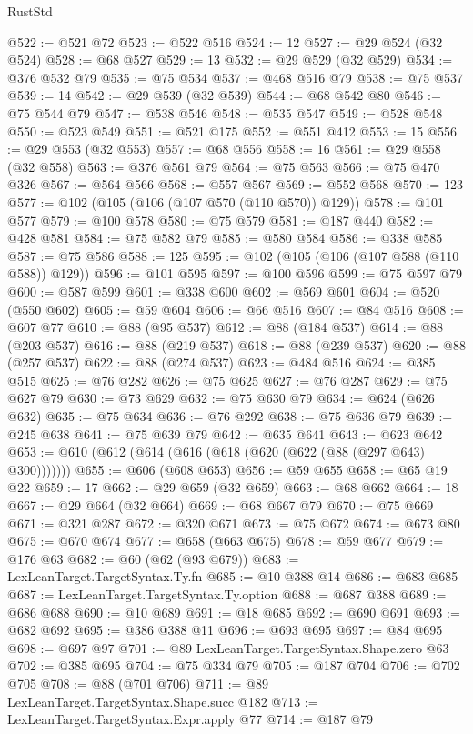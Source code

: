 \begin{lexlean}{RustStd}
\begin{coremodule}
@522 := @521 @72
@523 := @522 @516
@524 := 12
@527 := @29 @524 (@32 @524)
@528 := @68 @527
@529 := 13
@532 := @29 @529 (@32 @529)
@534 := @376 @532 @79
@535 := @75 @534
@537 := @468 @516 @79
@538 := @75 @537
@539 := 14
@542 := @29 @539 (@32 @539)
@544 := @68 @542 @80
@546 := @75 @544 @79
@547 := @538 @546
@548 := @535 @547
@549 := @528 @548
@550 := @523 @549
@551 := @521 @175
@552 := @551 @412
@553 := 15
@556 := @29 @553 (@32 @553)
@557 := @68 @556
@558 := 16
@561 := @29 @558 (@32 @558)
@563 := @376 @561 @79
@564 := @75 @563
@566 := @75 @470 @326
@567 := @564 @566
@568 := @557 @567
@569 := @552 @568
@570 := 123
@577 := @102 (@105 (@106 (@107 @570 (@110 @570)) @129))
@578 := @101 @577
@579 := @100 @578
@580 := @75 @579
@581 := @187 @440
@582 := @428 @581
@584 := @75 @582 @79
@585 := @580 @584
@586 := @338 @585
@587 := @75 @586
@588 := 125
@595 := @102 (@105 (@106 (@107 @588 (@110 @588)) @129))
@596 := @101 @595
@597 := @100 @596
@599 := @75 @597 @79
@600 := @587 @599
@601 := @338 @600
@602 := @569 @601
@604 := @520 (@550 @602)
@605 := @59 @604
@606 := @66 @516
@607 := @84 @516
@608 := @607 @77
@610 := @88 (@95 @537)
@612 := @88 (@184 @537)
@614 := @88 (@203 @537)
@616 := @88 (@219 @537)
@618 := @88 (@239 @537)
@620 := @88 (@257 @537)
@622 := @88 (@274 @537)
@623 := @484 @516
@624 := @385 @515
@625 := @76 @282
@626 := @75 @625
@627 := @76 @287
@629 := @75 @627 @79
@630 := @73 @629
@632 := @75 @630 @79
@634 := @624 (@626 @632)
@635 := @75 @634
@636 := @76 @292
@638 := @75 @636 @79
@639 := @245 @638
@641 := @75 @639 @79
@642 := @635 @641
@643 := @623 @642
@653 := @610 (@612 (@614 (@616 (@618 (@620 (@622 (@88 (@297 @643) @300)))))))
@655 := @606 (@608 @653)
@656 := @59 @655
@658 := @65 @19 @22
@659 := 17
@662 := @29 @659 (@32 @659)
@663 := @68 @662
@664 := 18
@667 := @29 @664 (@32 @664)
@669 := @68 @667 @79
@670 := @75 @669
@671 := @321 @287
@672 := @320 @671
@673 := @75 @672
@674 := @673 @80
@675 := @670 @674
@677 := @658 (@663 @675)
@678 := @59 @677
@679 := @176 @63
@682 := @60 (@62 (@93 @679))
@683 := LexLeanTarget.TargetSyntax.Ty.fn
@685 := @10 @388 @14
@686 := @683 @685
@687 := LexLeanTarget.TargetSyntax.Ty.option
@688 := @687 @388
@689 := @686 @688
@690 := @10 @689
@691 := @18 @685
@692 := @690 @691
@693 := @682 @692
@695 := @386 @388 @11
@696 := @693 @695
@697 := @84 @695
@698 := @697 @97
@701 := @89 LexLeanTarget.TargetSyntax.Shape.zero @63
@702 := @385 @695
@704 := @75 @334 @79
@705 := @187 @704
@706 := @702 @705
@708 := @88 (@701 @706)
@711 := @89 LexLeanTarget.TargetSyntax.Shape.succ @182
@713 := LexLeanTarget.TargetSyntax.Expr.apply @77
@714 := @187 @79

\end{coremodule}
\end{lexlean}
